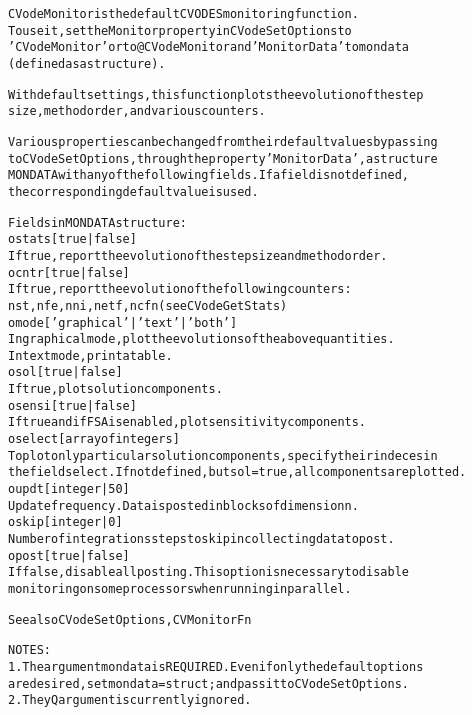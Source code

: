 \begin{alltt}
CVodeMonitor is the default CVODES monitoring function.
   To use it, set the Monitor property in CVodeSetOptions to
   'CVodeMonitor' or to @CVodeMonitor and 'MonitorData' to mondata
   (defined as a structure).
  
   With default settings, this function plots the evolution of the step 
   size, method order, and various counters.
   
   Various properties can be changed from their default values by passing
   to CVodeSetOptions, through the property 'MonitorData', a structure
   MONDATA with any of the following fields. If a field is not defined, 
   the corresponding default value is used.

   Fields in MONDATA structure:
     o stats [ {true} | false ]
         If true, report the evolution of the step size and method order.
     o cntr [ {true} | false ]
         If true, report the evolution of the following counters:
         nst, nfe, nni, netf, ncfn (see CVodeGetStats)
     o mode [ {'graphical'} | 'text' | 'both' ] 
         In graphical mode, plot the evolutions of the above quantities.
         In text mode, print a table.
     o sol  [ true | {false} ]
         If true, plot solution components.
     o sensi [ true | {false} ]
         If true and if FSA is enabled, plot sensitivity components.
     o select [ array of integers ]
         To plot only particular solution components, specify their indeces in
         the field select. If not defined, but sol=true, all components are plotted.
     o updt [ integer | {50} ]
         Update frequency. Data is posted in blocks of dimension n.
     o skip [ integer | {0} ]
         Number of integrations steps to skip in collecting data to post.
     o post [ {true} | false ]
         If false, disable all posting. This option is necessary to disable
         monitoring on some processors when running in parallel.

   See also CVodeSetOptions, CVMonitorFn

   NOTES:
     1. The argument mondata is REQUIRED. Even if only the default options
        are desired, set mondata=struct; and pass it to CVodeSetOptions.
     2. The yQ argument is currently ignored.
\end{alltt}


 


 



\vspace{0.1in}